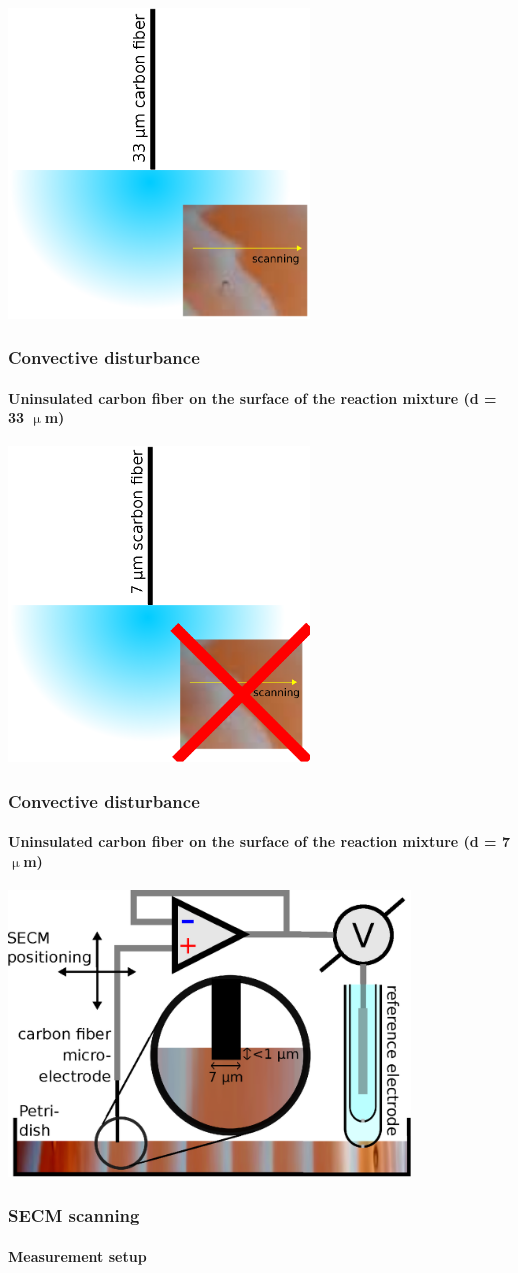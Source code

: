 \documentclass{beamer}
\begin{document}
\begin{frame}
	\centering
	\includegraphics[width=0.6\textwidth]{szigeteles3.eps}
	\frametitle{Convective disturbance}
	\framesubtitle{Uninsulated carbon fiber on the surface of the reaction mixture (d = 33 $\upmu$m)}
\end{frame}

\begin{frame}
	\centering
	\includegraphics[width=0.6\textwidth]{szigeteles4.eps}
	\frametitle{Convective disturbance}
	\framesubtitle{Uninsulated carbon fiber on the surface of the reaction mixture (d = 7 $\upmu$m)}
\end{frame}

\begin{frame}
	\centering
	\includegraphics[width=0.8\textwidth]{setup.eps}
	\frametitle{SECM scanning}
	\framesubtitle{Measurement setup}
\end{frame}
\end{document}

